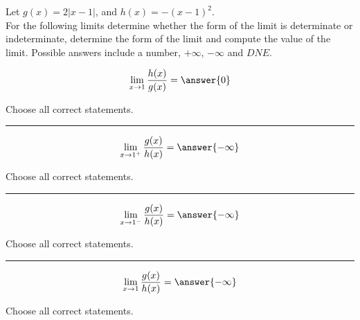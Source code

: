 \documentclass{ximera}
\author{Nela Lakos \and Kyle Parsons}
\begin{document}
\begin{exercise}

Let $g(x) = 2\left|x-1\right|$, and $h(x) = -(x-1)^2$.\\

For the following limits determine whether the form of the limit is determinate or indeterminate, determine the form of the limit and compute the value of the limit.  Possible answers include a number, $+\infty$, $-\infty$ and $DNE$.

\[
\lim_{x\to1}\frac{h(x)}{g(x)} = \answer{0}
\]


Choose all correct statements.
\begin{selectAll} 
\end{selectAll}

\noindent\rule[0.5ex]{\linewidth}{0.2pt}
\[
\lim_{x\to1^{+}}\frac{g(x)}{h(x)} = \answer{-\infty}
\]


Choose all correct statements.
\begin{selectAll} 
\end{selectAll}

\noindent\rule[0.5ex]{\linewidth}{0.2pt}

\[
\lim_{x\to1^{-}}\frac{g(x)}{h(x)} = \answer{-\infty}
\]


Choose all correct statements.
\begin{selectAll} 
\end{selectAll}

\noindent\rule[0.5ex]{\linewidth}{0.2pt}
\[
\lim_{x\to1}\frac{g(x)}{h(x)} = \answer{-\infty}
\]


Choose all correct statements.
\begin{selectAll} 
\end{selectAll}


\end{exercise}
\end{document}
